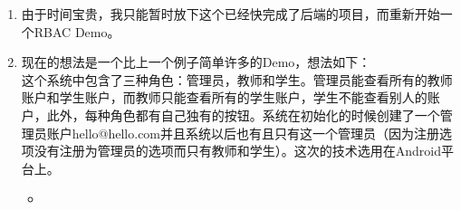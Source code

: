 \begin{itemize}
\begin{enumerate}
		\item
		由于时间宝贵，我只能暂时放下这个已经快完成了后端的项目，而重新开始一个RBAC Demo。
		
		\item
		现在的想法是一个比上一个例子简单许多的Demo，想法如下：\\ 这个系统中包含了三种角色：管理员，教师和学生。管理员能查看所有的教师账户和学生账户，而教师只能查看所有的学生账户，学生不能查看别人的账户，此外，每种角色都有自己独有的按钮。系统在初始化的时候创建了一个管理员账户hello@hello.com并且系统以后也有且只有这一个管理员（因为注册选项没有注册为管理员的选项而只有教师和学生）。这次的技术选用在Android平台上。
		\begin{itemize}
			\item 
		\end{itemize}
	\end{enumerate}
	
	
\end{itemize}
